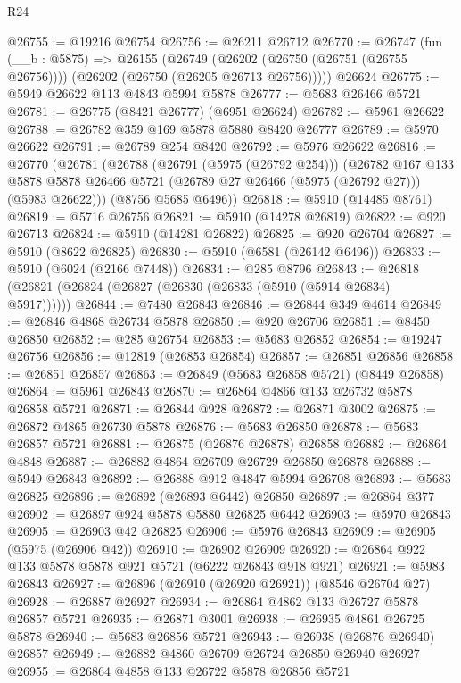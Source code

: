 \begin{lexlean}{R24}
\begin{coremodule}
@26755 := @19216 @26754
@26756 := @26211 @26712
@26770 := @26747
    (fun (__b : @5875) =>
    @26155
      (@26749 (@26202 (@26750 (@26751 (@26755 @26756)))) (@26202 (@26750 (@26205 @26713 @26756)))))
    @26624
@26775 := @5949 @26622 @113 @4843 @5994 @5878
@26777 := @5683 @26466 @5721
@26781 := @26775 (@8421 @26777) (@6951 @26624)
@26782 := @5961 @26622
@26788 := @26782 @359 @169 @5878 @5880 @8420 @26777
@26789 := @5970 @26622
@26791 := @26789 @254 @8420
@26792 := @5976 @26622
@26816 := @26770
    (@26781
      (@26788
        (@26791 (@5975 (@26792 @254)))
        (@26782
          @167
          @133
          @5878
          @5878
          @26466
          @5721
          (@26789 @27 @26466 (@5975 (@26792 @27)))
          (@5983 @26622)))
      (@8756 @5685 @6496))
@26818 := @5910 (@14485 @8761)
@26819 := @5716 @26756
@26821 := @5910 (@14278 @26819)
@26822 := @920 @26713
@26824 := @5910 (@14281 @26822)
@26825 := @920 @26704
@26827 := @5910 (@8622 @26825)
@26830 := @5910 (@6581 (@26142 @6496))
@26833 := @5910 (@6024 (@2166 @7448))
@26834 := @285 @8796
@26843 := @26818 (@26821 (@26824 (@26827 (@26830 (@26833 (@5910 (@5914 @26834) @5917))))))
@26844 := @7480 @26843
@26846 := @26844 @349 @4614
@26849 := @26846 @4868 @26734 @5878
@26850 := @920 @26706
@26851 := @8450 @26850
@26852 := @285 @26754
@26853 := @5683 @26852
@26854 := @19247 @26756
@26856 := @12819 (@26853 @26854)
@26857 := @26851 @26856
@26858 := @26851 @26857
@26863 := @26849 (@5683 @26858 @5721) (@8449 @26858)
@26864 := @5961 @26843
@26870 := @26864 @4866 @133 @26732 @5878 @26858 @5721
@26871 := @26844 @928
@26872 := @26871 @3002
@26875 := @26872 @4865 @26730 @5878
@26876 := @5683 @26850
@26878 := @5683 @26857 @5721
@26881 := @26875 (@26876 @26878) @26858
@26882 := @26864 @4848
@26887 := @26882 @4864 @26709 @26729 @26850 @26878
@26888 := @5949 @26843
@26892 := @26888 @912 @4847 @5994 @26708
@26893 := @5683 @26825
@26896 := @26892 (@26893 @6442) @26850
@26897 := @26864 @377
@26902 := @26897 @924 @5878 @5880 @26825 @6442
@26903 := @5970 @26843
@26905 := @26903 @42 @26825
@26906 := @5976 @26843
@26909 := @26905 (@5975 (@26906 @42))
@26910 := @26902 @26909
@26920 := @26864 @922 @133 @5878 @5878 @921 @5721 (@6222 @26843 @918 @921)
@26921 := @5983 @26843
@26927 := @26896 (@26910 (@26920 @26921)) (@8546 @26704 @27)
@26928 := @26887 @26927
@26934 := @26864 @4862 @133 @26727 @5878 @26857 @5721
@26935 := @26871 @3001
@26938 := @26935 @4861 @26725 @5878
@26940 := @5683 @26856 @5721
@26943 := @26938 (@26876 @26940) @26857
@26949 := @26882 @4860 @26709 @26724 @26850 @26940 @26927
@26955 := @26864 @4858 @133 @26722 @5878 @26856 @5721

\end{coremodule}
\end{lexlean}
